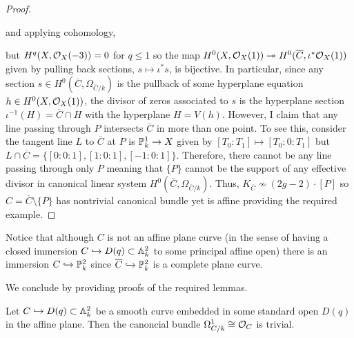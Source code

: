 \documentclass[12pt]{article}
\begin{document}
\begin{proof}
\begin{center}
\end{center}
and applying cohomology,
\begin{center}
\end{center}
but $H^q(X, \struct{X}(-3)) = 0$ for $q \le 1$ so the map $H^0(X, \struct{X}(1)) \onto H^0(\overline{C}, \iota^* \struct{X}(1))$ given by pulling back sections, $s \mapsto \iota^* s$, is bijective. In particular, since any section $s \in H^0(\overline{C}, \Omega_{\overline{C}/k})$ is the pullback of some hyperplane equation $h \in H^0(X, \struct{X}(1))$, the divisor of zeros associated to $s$ is the hyperplane section $\iota^{-1}(H) = \overline{C} \cap H$ with the hyperplane $H = V(h)$. However, I claim that any line passing through $P$ intersects $\overline{C}$ in more than one point. To see this, consider the tangent line $L$ to $\overline{C}$ at $P$ is $\P^1_k \to X$ given by $[T_0 : T_1] \mapsto [T_0 : 0 : T_1]$ but $L \cap \overline{C} = \{[0 : 0 : 1], [1 : 0 : 1], [-1 : 0 : 1] \}$. Therefore, there cannot be any line passing through only $P$ meaning that $\{ P \}$ cannot be the support of any effective divisor in canonical linear system $H^0(\overline{C}, \Omega_{\overline{C}/k})$. Thus, $K_{\overline{C}} \not\sim (2g - 2) \cdot [P]$ so $C = \overline{C} \setminus \{ P \}$ has nontrivial canonical bundle yet is affine providing the required example.
\end{proof}

\begin{rmk}
Notice that although $C$ is not an affine plane curve (in the sense of having a closed immersion $C \embed D(q) \subset \A^2_k$ to some principal affine open) there is an immersion $C \embed \P^2_k$ since $\overline{C} \embed \P^2_k$ is a complete plane curve.
\end{rmk}
\noindent
We conclude by providing proofs of the required lemmas.

\begin{lemma} \label{plane_curve_trivial_canonical}
Let $C \embed D(q) \subset \A^2_k$ be a smooth curve embedded in some standard open $D(q)$ in the affine plane. Then the canoncial bundle $\Omega^1_{C/k} \cong \struct{C}$ is trivial.
\end{lemma}
\end{document}
